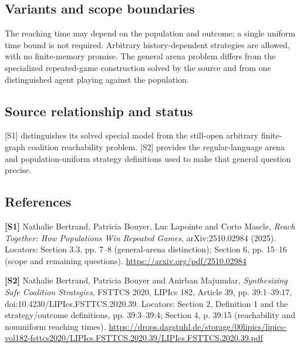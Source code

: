 \documentclass[11pt,a4paper]{article}
\begin{document}
\subsection*{Variants and scope boundaries}
The reaching time may depend on the population and outcome; a single uniform time bound is not required. Arbitrary history-dependent strategies are allowed, with no finite-memory promise. The general arena problem differs from the specialized repeated-game construction solved by the source and from one distinguished agent playing against the population.
\subsection*{Source relationship and status}
[S1] distinguishes its solved special model from the still-open arbitrary finite-graph coalition reachability problem. [S2] provides the regular-language arena and population-uniform strategy definitions used to make that general question precise.
\subsection*{References}
\begingroup\footnotesize\raggedright
\textbf{[S1]} Nathalie Bertrand, Patricia Bouyer, Luc Lapointe and Corto Mascle, \emph{Reach Together: How Populations Win Repeated Games}, arXiv:2510.02984 (2025). Locators: Section 3.3, pp. 7--8 (general-arena distinction); Section 6, pp. 15--16 (scope and remaining questions). \url{https://arxiv.org/pdf/2510.02984}

\textbf{[S2]} Nathalie Bertrand, Patricia Bouyer and Anirban Majumdar, \emph{Synthesizing Safe Coalition Strategies}, FSTTCS 2020, LIPIcs 182, Article 39, pp. 39:1--39:17, doi:10.4230/LIPIcs.FSTTCS.2020.39. Locators: Section 2, Definition 1 and the strategy/outcome definitions, pp. 39:3--39:4; Section 4, p. 39:15 (reachability and nonuniform reaching times). \url{https://drops.dagstuhl.de/storage/00lipics/lipics-vol182-fsttcs2020/LIPIcs.FSTTCS.2020.39/LIPIcs.FSTTCS.2020.39.pdf}
\end{document}
